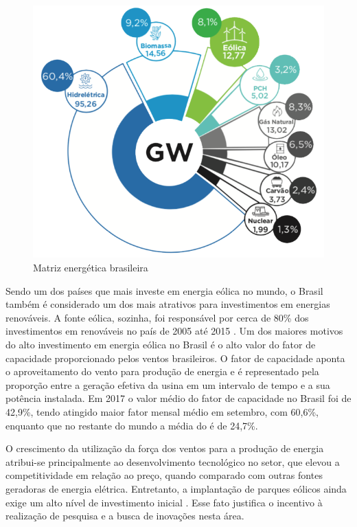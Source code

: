 \begin{figure}[htbp!] \begin{center}
\includegraphics[width=0.75\linewidth]{./figuras/matriz-energetica-brasileira}
\caption{Matriz energética brasileira}
\label{Fig:matriz-energetica-brasileira}
\end{center} 
\end{figure}

Sendo um dos países que mais investe em energia eólica no mundo, o Brasil também é considerado um dos mais atrativos para investimentos em energias renováveis. A fonte eólica, sozinha, foi responsável por cerca de 80\% dos investimentos em renováveis no país de 2005 até 2015 \cite{CENARIO}. Um dos maiores motivos do alto investimento em energia eólica no Brasil é o alto valor do fator de capacidade proporcionado pelos ventos brasileiros. O fator de capacidade aponta o aproveitamento do vento para produção de energia e é representado pela proporção entre a geração efetiva da usina em um intervalo de tempo e a sua potência instalada. Em 2017 o valor médio do fator de capacidade no Brasil foi de 42,9\%, tendo atingido maior fator mensal médio em setembro, com 60,6\%, enquanto que no restante do mundo a média do é de 24,7\%.

O crescimento da utilização da força dos ventos para a produção de energia atribui-se principalmente ao desenvolvimento tecnológico no setor, que elevou a competitividade em relação ao preço, quando comparado com outras fontes geradoras de energia elétrica. Entretanto, a implantação de parques eólicos ainda exige um alto nível de investimento inicial \cite{matrizes-energeticas-brasil}. Esse fato justifica o incentivo à realização de pesquisa e a busca de inovações nesta área.

